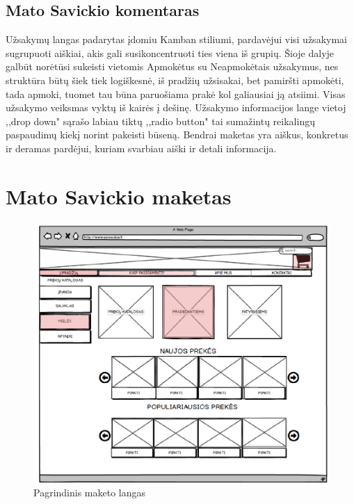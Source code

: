 \documentclass[oneside]{VUMIFPSkursinis}
\begin{document}
	\subsection{Mato Savickio komentaras}
Užsakymų langas padarytas įdomiu Kamban stiliumi, pardavėjui visi užsakymai sugrupuoti aiškiai, akis gali susikoncentruoti ties viena iš grupių. Šioje dalyje galbūt norėtūsi sukeisti vietomis Apmokėtus su Neapmokėtais užsakymus, nes struktūra būtų šiek tiek logiškesnė, iš pradžių užsisakai, bet pamiršti apmokėti, tada apmoki, tuomet tau būna paruošiama prakė kol galiausiai ją atsiimi. Visas užsakymo veiksmas vyktų iš kairės į dešinę. Užsakymo informacijos lange vietoj ,,drop down"  sąrašo labiau tiktų ,,radio button" tai sumažintų reikalingų paspaudimų kiekį norint pakeisti būseną. Bendrai maketas yra aiškus, konkretus ir deramas pardėjui, kuriam svarbiau aiški ir detali informacija.

\section{Mato Savickio maketas}
	\begin{figure}
  		\includegraphics[width=\linewidth]{mak1.png}
  		\caption{Pagrindinis maketo langas}
 		 \label{fig:mak1}
	\end{figure}
\end{document}
